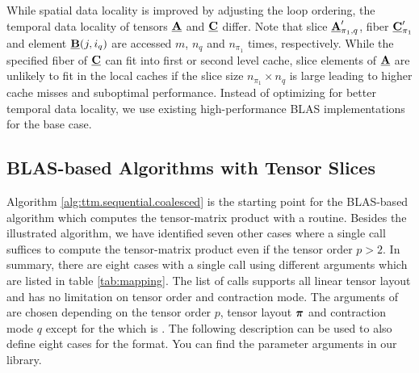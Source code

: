 While spatial data locality is improved by adjusting the loop ordering, the temporal data locality of tensors $\underline{\mathbf{A}}$ and $\underline{\mathbf{C}}$ differ.
Note that slice $\underline{\mathbf{A}}_{\pi_1,q}'$, fiber $\underline{\mathbf{C}}_{\pi_1}'$ and element $\underline{\mathbf{B}}(j,i_q)$ are accessed $m$, $n_q$ and $n_{\pi_1}$ times, respectively.
While the specified fiber of $\underline{\mathbf{C}}$ can fit into first or second level cache, slice elements of $\underline{\mathbf{A}}$ are unlikely to fit in the local caches if the slice size $n_{\pi_1} \times n_q$ is large leading to higher cache misses and suboptimal performance.
Instead of optimizing for better temporal data locality, we use existing high-performance BLAS implementations for the base case.

\subsection{BLAS-based Algorithms with Tensor Slices}
\label{sec:design:blas.based.algorithm.slices}
Algorithm \ref{alg:ttm.sequential.coalesced} is the starting point for the BLAS-based algorithm which computes the tensor-matrix product with a  routine.
Besides the illustrated algorithm, we have identified seven other cases where a single  call suffices to compute the tensor-matrix product even if the tensor order $p>2$.
In summary, there are eight cases with a single  call using different arguments which are listed in table \ref{tab:mapping}.
The list of  calls supports all linear tensor layout and has no limitation on tensor order and contraction mode.
The arguments of  are chosen depending on the tensor order $p$, tensor layout $\boldsymbol{\pi}$ and contraction mode $q$ except for the  which is .
The following description can be used to also define eight cases for the  format. 
You can find the parameter arguments in our  library.

